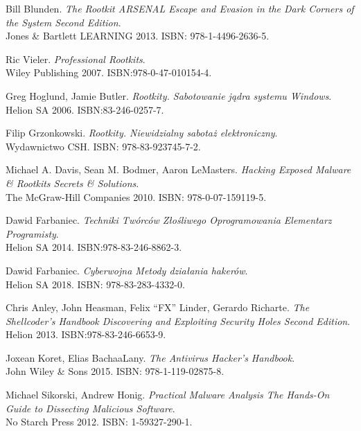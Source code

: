 \begin{thebibliography}{9}



 Bill Blunden.
\textit{The Rootkit ARSENAL Escape and Evasion in the Dark Corners of the System Second Edition}.
\\ Jones \& Bartlett LEARNING 2013. ISBN: 978-1-4496-2636-5.

Ric Vieler. 
\textit{Professional Rootkits}. 
\\ Wiley Publishing 2007. ISBN:978-0-47-010154-4.

Greg Hoglund, Jamie Butler. 
\textit{Rootkity. Sabotowanie jądra systemu Windows}. 
\\Helion SA 2006. ISBN:83-246-0257-7.

Filip Grzonkowski. 
\textit{Rootkity. Niewidzialny sabotaż elektroniczny}. 
\\ Wydawnictwo CSH. ISBN: 978-83-923745-7-2.


Michael A. Davis, Sean M. Bodmer, Aaron LeMasters.
\textit{Hacking Exposed Malware \& Rootkits Secrets \& Solutions}. 
\\ The McGraw-Hill Companies 2010. ISBN: 978-0-07-159119-5.


Dawid Farbaniec. 
\textit{Techniki Twórców Złośliwego Oprogramowania Elementarz Programisty}. 
\\ Helion SA 2014. ISBN:978-83-246-8862-3.

Dawid Farbaniec. 
\textit{Cyberwojna Metody działania hakerów}. 
\\ Helion SA 2018. ISBN: 978-83-283-4332-0.

Chris Anley, John Heasman, Felix “FX” Linder, Gerardo Richarte. 
\textit{The Shellcoder’s Handbook Discovering and Exploiting Security Holes Second Edition}. 
\\ Helion 2013. ISBN:978-83-246-6653-9.


Joxean Koret, Elias BachaaLany. 
\textit{The Antivirus Hacker’s Handbook}. 
\\ John Wiley \& Sons 2015. ISBN: 978-1-119-02875-8.



Michael Sikorski, Andrew Honig. 
\textit{Practical Malware Analysis The Hands-On Guide to Dissecting Malicious Software}. 
\\No Starch Press  2012.  ISBN: 1-59327-290-1.



\end{thebibliography}

